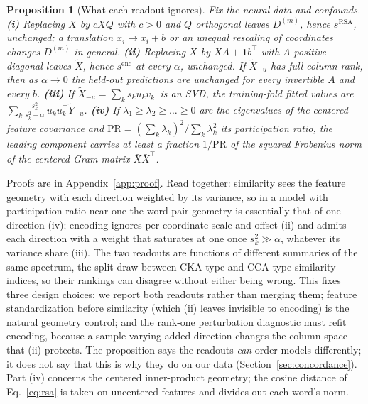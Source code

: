 \documentclass{article}
\newtheorem{proposition}{Proposition}
\begin{document}
\begin{proposition}[What each readout ignores]\label{prop:invariance}
Fix the neural data and confounds. \textbf{(i)} Replacing $X$ by $cXQ$ with $c>0$ and $Q$
orthogonal leaves $D^{(m)}$, hence $s^{\mathrm{RSA}}$, unchanged; a translation $x_i\mapsto x_i+b$
or an unequal rescaling of coordinates changes $D^{(m)}$ in general. \textbf{(ii)} Replacing $X$ by
$XA+\mathbf 1b^\top$ with $A$ positive diagonal leaves $\tilde X$, hence $s^{\mathrm{enc}}$ at every
$\alpha$, unchanged. If $\tilde X_{-u}$ has full column rank, then as $\alpha\to0$ the held-out
predictions are unchanged for every invertible $A$ and every $b$. \textbf{(iii)} If
$\tilde X_{-u}=\sum_k s_k u_k v_k^\top$ is an SVD, the training-fold fitted values are
$\sum_k\frac{s_k^2}{s_k^2+\alpha}\,u_k u_k^\top\tilde Y_{-u}$. \textbf{(iv)} If
$\lambda_1\ge\lambda_2\ge\dots\ge0$ are the eigenvalues of the centered feature covariance and
$\mathrm{PR}=(\sum_k\lambda_k)^2/\sum_k\lambda_k^2$ its participation ratio, the leading component
carries at least a fraction $1/\mathrm{PR}$ of the squared Frobenius norm of the centered Gram
matrix $\bar X\bar X^\top$.
\end{proposition}

Proofs are in Appendix~\ref{app:proof}. Read together: similarity sees the feature geometry with
each direction weighted by its variance, so in a model with participation ratio near one the
word-pair geometry is essentially that of one direction (iv); encoding ignores per-coordinate scale
and offset (ii) and admits each direction with a weight that saturates at one once
$s_k^2\gg\alpha$, whatever its variance share (iii). The two readouts are functions of
different summaries of the same spectrum, the split \citet{kornblith2019similarity} draw between
CKA-type and CCA-type similarity indices, so their rankings can disagree without either being
wrong. This fixes three design choices: we report both readouts rather than merging them;
feature standardization before similarity (which (ii) leaves invisible to encoding) is the natural
geometry control; and the rank-one perturbation diagnostic must refit encoding, because a
sample-varying added direction changes the column space that (ii) protects. The proposition says the
readouts \emph{can} order models differently; it does not say that this is why they do on our
data (Section~\ref{sec:concordance}). Part (iv) concerns the centered inner-product geometry; the
cosine distance of Eq.~\eqref{eq:rsa} is taken on uncentered features and divides out each word's norm.
\end{document}
